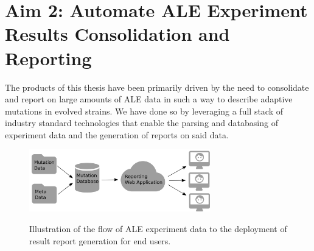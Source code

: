 \documentclass[12pt,final,masters,chapterheads]{ucsd}  %
\begin{document}
%
%
%
%

\chapter{Aim 2: Automate ALE Experiment Results Consolidation and Reporting}

%
%



The products of this thesis have been primarily driven by the need to consolidate and report on large amounts of ALE data in such a way to describe adaptive mutations in evolved strains. We have done so by leveraging a full stack of industry standard technologies that enable the parsing and databasing of experiment data and the generation of reports on said data.

\begin{figure}[h!]
  \caption{Illustration of the flow of ALE experiment data to the deployment of result report generation for end users.}
  \centering
  \includegraphics[width=0.7\textwidth]{deployment_diagram.png}
  \label{fig:deployment}
\end{figure}
\end{document}
